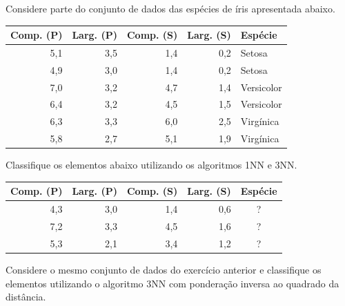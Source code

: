\begin{exercise}
Considere parte do conjunto de dados das espécies de íris apresentada abaixo.

\begin{table}[h]
	\centering
	\begin{tabular}{rrrrl}
		\hline
		\textbf{Comp. (P)} & \textbf{Larg. (P)} & \textbf{Comp. (S)} & \textbf{Larg. (S)} & \textbf{Espécie} \\
		\hline
		5,1 & 3,5 & 1,4 & 0,2 & Setosa \\
		4,9 & 3,0 & 1,4 & 0,2 & Setosa \\
		7,0 & 3,2 & 4,7 & 1,4 & Versicolor \\
		6,4 & 3,2 & 4,5 & 1,5 & Versicolor \\
		6,3 & 3,3 & 6,0 & 2,5 & Virgínica \\
		5,8 & 2,7 & 5,1 & 1,9 & Virgínica \\
		\hline
	\end{tabular}
\end{table}

Classifique os elementos abaixo utilizando os algoritmos 1NN e 3NN.

\begin{table}[h]
	\centering
	\begin{tabular}{rrrrc}
		\hline
		\textbf{Comp. (P)} & \textbf{Larg. (P)} & \textbf{Comp. (S)} & \textbf{Larg. (S)} & \textbf{Espécie} \\
		\hline
		4,3 & 3,0 & 1,4 & 0,6 & ? \\
		7,2 & 3,3 & 4,5 & 1,6 & ? \\
		5,3 & 2,1 & 3,4 & 1,2 & ? \\
		\hline
	\end{tabular}
\end{table}

\end{exercise}

\begin{exercise}
Considere o mesmo conjunto de dados do exercício anterior e classifique os elementos utilizando o algoritmo 3NN com ponderação inversa ao quadrado da distância.
\end{exercise}

